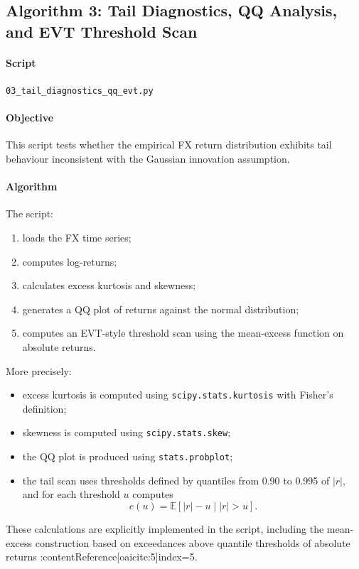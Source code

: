	\subsection{Algorithm 3: Tail Diagnostics, QQ Analysis, and EVT Threshold Scan}
	
	\paragraph{Script}
	\texttt{03\_tail\_diagnostics\_qq\_evt.py}
	
	\paragraph{Objective}
	This script tests whether the empirical FX return distribution exhibits tail behaviour inconsistent with the Gaussian innovation assumption.
	
	\paragraph{Algorithm}
	The script:
	\begin{enumerate}
		\item loads the FX time series;
		\item computes log-returns;
		\item calculates excess kurtosis and skewness;
		\item generates a QQ plot of returns against the normal distribution;
		\item computes an EVT-style threshold scan using the mean-excess function on absolute returns.
	\end{enumerate}
	
	More precisely:
	\begin{itemize}
		\item excess kurtosis is computed using \texttt{scipy.stats.kurtosis} with Fisher’s definition;
		\item skewness is computed using \texttt{scipy.stats.skew};
		\item the QQ plot is produced using \texttt{stats.probplot};
		\item the tail scan uses thresholds defined by quantiles from 0.90 to 0.995 of \(|r|\), and for each threshold \(u\) computes
		\[
		e(u) = \mathbb{E}[|r|-u \mid |r|>u].
		\]
	\end{itemize}
	
	These calculations are explicitly implemented in the script, including the mean-excess construction based on exceedances above quantile thresholds of absolute returns :contentReference[oaicite:5]{index=5}.
	
